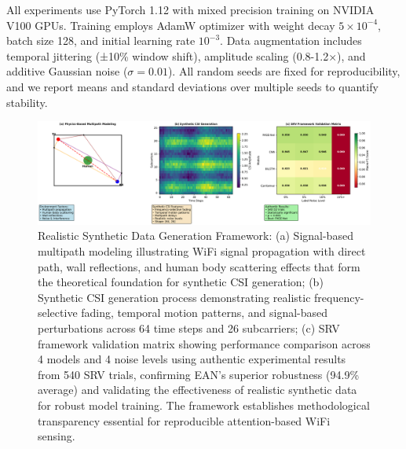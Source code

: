 \documentclass[lettersize,journal]{IEEEtran}
\begin{document}
All experiments use PyTorch 1.12 with mixed precision training on NVIDIA V100 GPUs. Training employs AdamW optimizer with weight decay $5 \times 10^{-4}$, batch size 128, and initial learning rate $10^{-3}$. Data augmentation includes temporal jittering (±10\% window shift), amplitude scaling (0.8-1.2×), and additive Gaussian noise ($\sigma=0.01$). All random seeds are fixed for reproducibility, and we report means and standard deviations over multiple seeds to quantify stability.

\begin{figure}[t]
\centering
\includegraphics[width=\linewidth]{plots/fig2_physics_modeling_v4.pdf}
\caption{Realistic Synthetic Data Generation Framework: (a) Signal-based multipath modeling illustrating WiFi signal propagation with direct path, wall reflections, and human body scattering effects that form the theoretical foundation for synthetic CSI generation; (b) Synthetic CSI generation process demonstrating realistic frequency-selective fading, temporal motion patterns, and signal-based perturbations across 64 time steps and 26 subcarriers; (c) SRV framework validation matrix showing performance comparison across 4 models and 4 noise levels using authentic experimental results from 540 SRV trials, confirming EAN's superior robustness (94.9\% average) and validating the effectiveness of realistic synthetic data for robust model training. The framework establishes methodological transparency essential for reproducible attention-based WiFi sensing.}
\label{fig:physics_modeling}
\end{figure}
\end{document}
